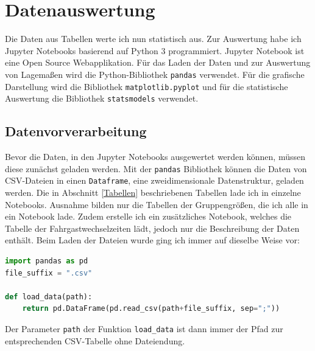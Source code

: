 \chapter{Datenauswertung} \label{Datenauswertung}
Die Daten aus Tabellen werte ich nun statistisch aus. Zur Auswertung habe ich \textsf{Jupyter Notebooks} basierend auf Python 3 programmiert. \textsf{Jupyter Notebook} ist eine Open Source Webapplikation. Für das Laden der Daten und zur Auswertung von Lagemaßen wird die Python-Bibliothek \texttt{pandas} verwendet. Für die grafische Darstellung wird die Bibliothek \texttt{matplotlib.pyplot} und für die statistische Auswertung die Bibliothek \texttt{statsmodels} verwendet.

\section{Datenvorverarbeitung}  \label{Datenvorverarbeitung}
Bevor die Daten, in den \textsf{Jupyter Notebooks} ausgewertet werden können, müssen diese zunächst geladen werden. Mit der \texttt{pandas} Bibliothek können die Daten von CSV-Dateien in einen \texttt{Dataframe}, eine zweidimensionale Datenstruktur, geladen werden. Die in Abschnitt \ref{Tabellen} beschriebenen Tabellen lade ich in einzelne \textsf{Notebooks}. Ausnahme bilden nur die Tabellen der Gruppengrößen, die ich alle in ein \textsf{Notebook} lade. Zudem erstelle ich ein zusätzliches \textsf{Notebook}, welches die Tabelle der Fahrgastwechselzeiten lädt, jedoch nur die Beschreibung der Daten enthält. Beim Laden der Dateien wurde ging ich immer auf dieselbe Weise vor:

\begin{lstlisting}[language=Python]
import pandas as pd
file_suffix = ".csv"
 
def load_data(path):
    return pd.DataFrame(pd.read_csv(path+file_suffix, sep=";"))

\end{lstlisting}
Der Parameter \texttt{path} der Funktion \texttt{load\_data} ist dann immer der Pfad zur entsprechenden CSV-Tabelle ohne Dateiendung.

